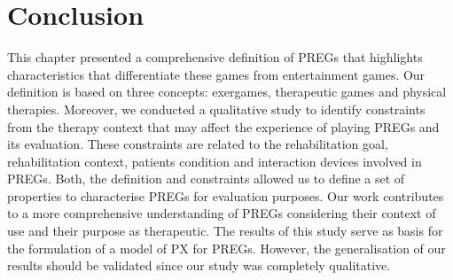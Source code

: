 \section{Conclusion} %
\label{sec:conclusion_char}
This chapter presented a comprehensive definition of \acp{PREG} that highlights characteristics that differentiate these games from entertainment games. Our definition is based on three concepts: exergames, therapeutic games and physical therapies. Moreover, we conducted a qualitative study to identify constraints from the therapy context that may affect the experience of playing \acp{PREG} and its evaluation. These constraints are related to the rehabilitation goal, rehabilitation context, patients condition and interaction devices involved in \acp{PREG}. Both, the definition and constraints allowed us to define a set of properties to characterise \acp{PREG} for evaluation purposes. Our work contributes to a more comprehensive understanding of \acp{PREG} considering their context of use and their purpose as therapeutic. The results of this study serve as basis for the formulation of a model of \ac{PX} for \acp{PREG}. However, the generalisation of our results should be validated since our study was completely qualitative.